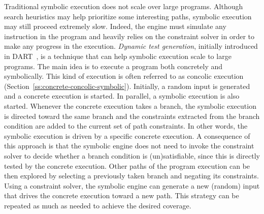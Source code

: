  Traditional symbolic execution does not scale over large programs. Although search heuristics may help prioritize some interesting paths, symbolic execution may still proceed extremely slow. Indeed, the engine must simulate any instruction in the program and heavily relies on the constraint solver in order to make any progress in the execution. {\em Dynamic test generation}, initially introduced in {\sc DART}~\cite{DART-PLDI05}, is a technique that can help symbolic execution scale to large programs. The main idea is to execute a program both concretely and symbolically. This kind of execution is often referred to as concolic execution (Section~\ref{ss:concrete-concolic-symbolic}). Initially, a random input is generated and a concrete execution is started. In parallel, a symbolic execution is also started. Whenever the concrete execution takes a branch, the symbolic execution is directed toward the same branch and the constraints extracted from the branch condition are added to the current set of path constraints. In other words, the symbolic execution is driven by a specific concrete execution. A consequence of this approach is that the symbolic engine does not need to invoke the constraint solver to decide whether a branch condition is (un)satisfiable, since this is directly tested by the concrete execution. Other paths of the program execution can be then explored by selecting a previously taken branch and negating its constraints. Using a constraint solver, the symbolic engine can generate a new (random) input that drives the concrete execution toward a new path. This strategy can be repeated as much as needed to achieve the desired coverage.

